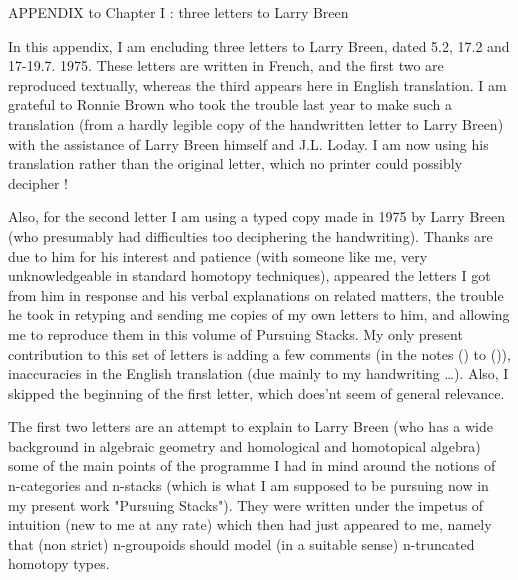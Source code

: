 \documentclass[11pt,a4paper]{article}
\begin{document}
APPENDIX to Chapter I : three letters to Larry Breen

In this appendix, I am encluding three letters to Larry Breen, dated
5.2, 17.2 and 17-19.7. 1975. These letters are written in French, and the
first two are reproduced textually, whereas the third appears here in English
translation. I am grateful to Ronnie Brown who took the trouble last year to
make such a translation (from a hardly legible  copy of the
handwritten letter to Larry Breen) with the assistance of Larry Breen himself
and J.L. Loday. I am now using his translation rather than the original
letter, which no printer could possibly decipher !

Also, for the second letter I am using a typed copy made in 1975 by Larry
Breen (who presumably had difficulties too deciphering the handwriting). Thanks
are due to him for his interest and patience (with someone like me, very
unknowledgeable in standard homotopy techniques), \struck{\ill{}} 
appeared   the letters I got from him in response and his
verbal explanations on related matters,  the
trouble he took in  retyping  and sending me
copies of my own letters to him, and allowing me to reproduce them in this
volume of Pursuing Stacks. My only present contribution to this set of letters
is adding a few comments (in the notes () to ()),
 inaccuracies in the English translation (due mainly
to my handwriting …). Also, I skipped the beginning of the first letter, which
does'nt seem  of general relevance.

The first two letters are an attempt to explain to Larry Breen (who has a wide
background in algebraic geometry and homological and homotopical algebra) some
of the main points of the programme I had in mind around the notions of
n-categories and n-stacks (which is what I am supposed to be pursuing now in my
present work "Pursuing Stacks"). They were written under the impetus of
  intuition  (new to me at any rate) which
then had just appeared to me, namely that (non strict) n-groupoids should model
(in a suitable sense) n-truncated homotopy types.
\end{document}
